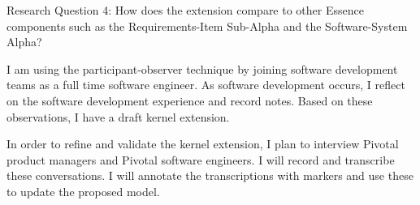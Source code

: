 \documentclass[preprint,12pt,3p]{elsarticle}
\begin{document}
Research Question 4: How does the extension compare to other Essence components such as the Requirements-Item Sub-Alpha and the Software-System Alpha? 

I am using the participant-observer technique by joining software development teams as a full time software engineer. As software development occurs, I reflect on the software development experience and record notes. Based on these observations, I have a draft kernel extension.

In order to refine and validate the kernel extension, I plan to interview Pivotal product managers and Pivotal software engineers. I will record and transcribe these conversations. I will annotate the transcriptions with markers and use these to update the proposed model.



\end{document}

